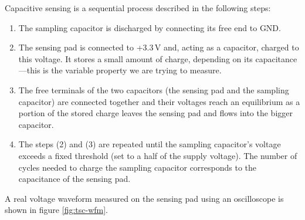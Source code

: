 \noindent
Capacitive sensing is a sequential process described in the following steps:

\begin{enumerate}
	\item The sampling capacitor is discharged by connecting its free end to \gls{GND}.
	\item The sensing pad is connected to +3.3\,V and, acting as a capacitor, charged to this voltage. It stores a small amount of charge, depending on its capacitance---this is the variable property we are trying to measure.
	\item The free terminals of the two capacitors (the sensing pad and the sampling capacitor) are connected together and their voltages reach an equilibrium as a portion of the stored charge leaves the sensing pad and flows into the bigger capacitor.
	\item The steps (2) and (3) are repeated until the sampling capacitor's voltage exceeds a fixed threshold (set to a half of the supply voltage). The number of cycles needed to charge the sampling capacitor corresponds to the capacitance of the sensing pad.
\end{enumerate}

\noindent
A real voltage waveform measured on the sensing pad using an oscilloscope is shown in figure \ref{fig:tsc-wfm}.

